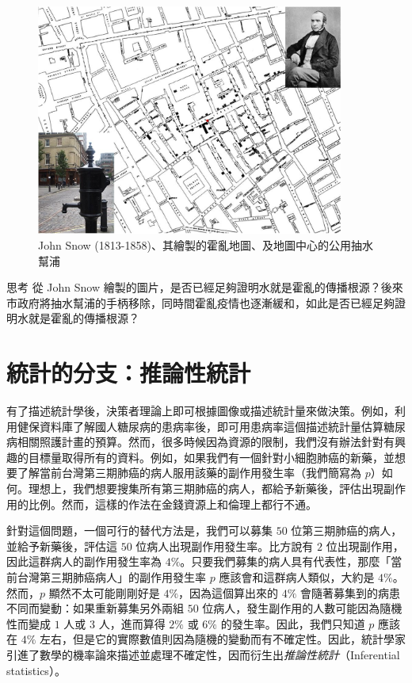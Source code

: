     \begin{figure}[htbp]
      \centering
      \includegraphics[width=0.9\textwidth]{figures/01-Overview/john_snow.png}
      \caption{John Snow (1813-1858)、其繪製的霍亂地圖、及地圖中心的公用抽水幫浦}
      \label{fig:john_snow}
    \end{figure}
    
    \bigskip
    
    \begin{custom}{思考}
        從 John Snow 繪製的圖片，是否已經足夠證明水就是霍亂的傳播根源？後來市政府將抽水幫浦的手柄移除，同時間霍亂疫情也逐漸緩和，如此是否已經足夠證明水就是霍亂的傳播根源？
    \end{custom}
    
    \bigskip
    
\section{統計的分支：推論性統計}

    有了描述統計學後，決策者理論上即可根據圖像或描述統計量來做決策。例如，利用健保資料庫了解國人糖尿病的患病率後，即可用患病率這個描述統計量估算糖尿病相關照護計畫的預算。然而，很多時候因為資源的限制，我們沒有辦法針對有興趣的目標量取得所有的資料。例如，如果我們有一個針對小細胞肺癌的新藥，並想要了解當前台灣第三期肺癌的病人服用該藥的副作用發生率（我們簡寫為 $p$）如何。理想上，我們想要搜集所有第三期肺癌的病人，都給予新藥後，評估出現副作用的比例。然而，這樣的作法在金錢資源上和倫理上都行不通。
    
    針對這個問題，一個可行的替代方法是，我們可以募集 $50$ 位第三期肺癌的病人，並給予新藥後，評估這 $50$ 位病人出現副作用發生率。比方說有 $2$ 位出現副作用，因此這群病人的副作用發生率為 $4\%$。只要我們募集的病人具有代表性，那麼「當前台灣第三期肺癌病人」的副作用發生率 $p$ 應該會和這群病人類似，大約是 $4\%$。然而，$p$ 顯然不太可能剛剛好是 $4\%$，因為這個算出來的 $4\%$ 會隨著募集到的病患不同而變動：如果重新募集另外兩組 $50$ 位病人，發生副作用的人數可能因為隨機性而變成 $1$ 人或 $3$ 人，進而算得 $2\%$ 或 $6\%$ 的發生率。因此，我們只知道 $p$ 應該在 $4\%$ 左右，但是它的實際數值則因為隨機的變動而有不確定性。因此，統計學家引進了數學的機率論來描述並處理不確定性，因而衍生出\textit{推論性統計}（Inferential statistics）。
    
